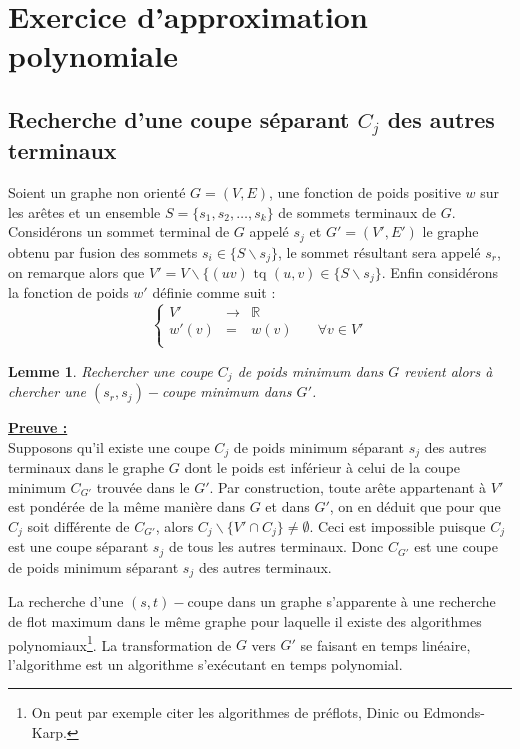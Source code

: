 \documentclass[a4paper, 11pt]{article}
\newtheorem{lemma}{Lemme}[subsection]
\begin{document}
\section*{Exercice d'approximation polynomiale}

\subsection*{Recherche d'une coupe s\'{e}parant $C_j$ des autres terminaux}

Soient un graphe non orient\'{e} $G = (V, E)$, une fonction de poids positive $w$ sur les ar\^{e}tes et un
ensemble $S = \{s_1, s_2, \dots, s_k\}$ de sommets terminaux de $G$. Consid\'{e}rons un sommet terminal
de $G$ appel\'{e} $s_j$ et $G' = (V', E')$ le graphe obtenu par fusion des sommets $s_i \in \{S
\backslash s_j\}$, le sommet r\'{e}sultant sera appel\'{e} $s_r$, on remarque alors que $V' = V
\backslash \{ (uv) \mbox{ tq } (u, v) \in \{S \backslash s_j\}$. Enfin consid\'{e}rons la fonction
de poids $w'$ d\'{e}finie comme suit :$$
\left \{ \begin{array}{rcll}
        V' & \longrightarrow & \mathbb{R} & \\
        w'(v) & = & w(v) & \quad \forall v \in V' \\
\end{array} \right .
$$

\begin{lemma}
Rechercher une coupe $C_j$ de poids minimum dans $G$ revient alors \`{a} chercher une $(s_r, s_j)-$coupe minimum
dans $G'$.
\end{lemma}

\textbf{\underline{Preuve :}} \\

Supposons qu'il existe une coupe $C_j$ de poids minimum s\'{e}parant $s_j$ des autres terminaux dans le
graphe $G$ dont le poids est inf\'{e}rieur \`{a} celui de la coupe minimum $C_{G'}$ trouv\'{e}e dans le $G'$.
Par construction, toute ar\^{e}te appartenant \`{a} $V'$ est pond\'{e}r\'{e}e de la m\^{e}me mani\`{e}re dans $G$ et dans
$G'$, on en d\'{e}duit que pour que $C_j$ soit diff\'{e}rente de $C_{G'}$, alors $C_j \backslash \{V' \cap C_j \}
\not = \emptyset$. Ceci est impossible puisque $C_j$ est une coupe s\'{e}parant $s_j$ de tous les autres
terminaux. Donc $C_{G'}$ est une coupe de poids minimum s\'{e}parant $s_j$ des autres terminaux.

La recherche d'une $(s,t)-$coupe dans un graphe s'apparente \`{a} une recherche de flot maximum dans le
m\^{e}me graphe pour laquelle il existe des algorithmes polynomiaux\footnote{On peut par exemple citer
les algorithmes de pr\'{e}flots, Dinic ou Edmonds-Karp.}. La transformation de $G$ vers $G'$ se faisant
en temps lin\'{e}aire, l'algorithme est un algorithme s'ex\'{e}cutant en temps polynomial.
\end{document}

